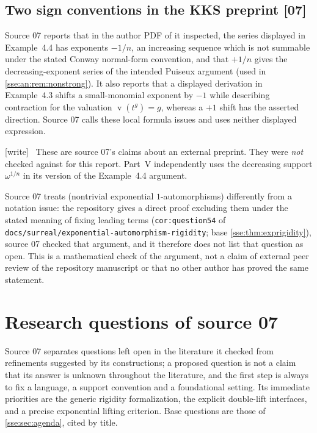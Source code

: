 \documentclass[11pt,a4paper]{article}
\numberwithin{equation}{section}
\theoremstyle{plain}
\theoremstyle{definition}
\theoremstyle{remark}
\newcommand{\val}{\operatorname{v}}
\newcommand{\lbl}[1]{\nolinkurl{#1}}%
\newcommand{\fn}[1]{\nolinkurl{#1}}%
\newcommand{\src}[1]{\textup{\textsf{\small[#1]}}}%
\newcommand{\wtag}{\textup{\textsf{[write]}}}%
\newenvironment{wnote}{\par\smallskip\noindent\wtag\ }{\par\smallskip}
\begin{document}
\subsection{Two sign conventions in the KKS preprint \src{07}}\label{sse:an:sub:kks}
Source 07 reports that in the author PDF of \cite{KKS} it inspected, the
series displayed in Example~4.4 has exponents $-1/n$, an increasing sequence
which is not summable under the stated Conway normal-form convention, and
that $+1/n$ gives the decreasing-exponent series of the intended Puiseux
argument (used in \cref{sse:an:rem:nonstrong}). It also reports that a
displayed derivation in Example~4.3 shifts a small-monomial exponent by $-1$
while describing contraction for the valuation $\val(t^g)=g$, whereas a $+1$
shift has the asserted direction. Source 07 calls these local formula issues
and uses neither displayed expression.
\begin{wnote}
These are source 07's claims about an external preprint. They were
\emph{not} checked against \cite{KKS} for this report. Part~V independently
uses the decreasing support $\omega^{1/n}$ in its version of the
Example~4.4 argument.
\end{wnote}
Source 07 treats \cite[Question~5.4]{KKS} (nontrivial exponential
$1$-automorphisms) differently from a notation issue: the repository gives a
direct proof excluding them under the stated meaning of fixing leading terms
(\lbl{cor:question54} of \fn{docs/surreal/exponential-automorphism-rigidity};
base \cref{sse:thm:exprigidity}), source 07 checked that argument, and it
therefore does not list that question as open. This is a mathematical check
of the argument, not a claim of external peer review of the repository
manuscript or that no other author has proved the same statement.

\section{Research questions of source 07}\label{sse:an:sec:questions}

Source 07 separates questions left open in the literature it checked from
refinements suggested by its constructions; a proposed question is not a
claim that its answer is unknown throughout the literature, and the first
step is always to fix a language, a support convention and a foundational
setting. Its immediate priorities are the generic rigidity formalization, the
explicit double-lift interfaces, and a precise exponential lifting criterion.
Base questions are those of \cref{sse:sec:agenda}, cited by title.
\end{document}
